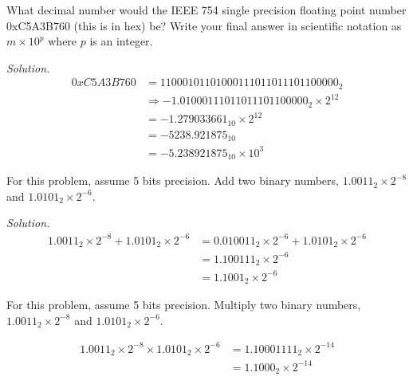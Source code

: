 \documentclass[12pt]{article}
\newenvironment{problem}[2][Problem]{\begin{trivlist}
\item[\hskip \labelsep {\bfseries #1}\hskip \labelsep {\bfseries
#2.}]}{\end{trivlist}}
\begin{document}
\begin{problem}{7}
What decimal number would the IEEE 754 single precision floating point number 0xC5A3B760 (this is in hex) be? Write your final answer in scientific notation as $m \times  10^p$ where $p$ is an integer.
\end{problem}

\textit{Solution.}
\begin{align*}
    0xC5A3B760 &= 1100 0101 1010 0011 1011 0111 0110 0000_2 \\
    &\Longrightarrow -1.01000111011011101100000_2 \times 2^{12} \tag*{(Normalized format)} \\
    &= -1.279033661_{10} \times 2^{12} \\
    &= -5238.921875_{10} \\
    &= -5.238921875_{10} \times 10^3
\end{align*}


\begin{problem}{8}
For this problem, assume 5 bits precision. Add two binary numbers, $1.0011_{2} \times 2^{-8}$ and $1.0101_2 \times 2^{-6}$.
\end{problem}

\textit{Solution.}
\begin{align*}
    1.0011_2 \times 2^{-8} + 1.0101_2 \times 2^{-6} &= 0.010011_2 \times 2^{-6} + 1.0101_2 \times 2^{-6} \\
    &= 1.100111_2 \times 2^{-6} \tag*{(No overflow/underflow)} \\ 
    &= 1.1001_2 \times 2^{-6} \tag*{(Truncated)}
\end{align*}

\begin{problem}{9}
For this problem, assume 5 bits precision. Multiply two binary numbers, $1.0011_2 \times 2^{-8}$ and $1.0101_2 \times 2^{-6}$.
\end{problem}

\begin{align*}
    1.0011_2 \times 2^{-8} \times 1.0101_2 \times 2^{-6} &= 1.10001111_2 \times 2^{-14} \tag*{(No overflow/underflow)} \\
    &= 1.1000_2 \times 2^{-14} \tag*{(Truncated)}
\end{align*}
\end{document}
